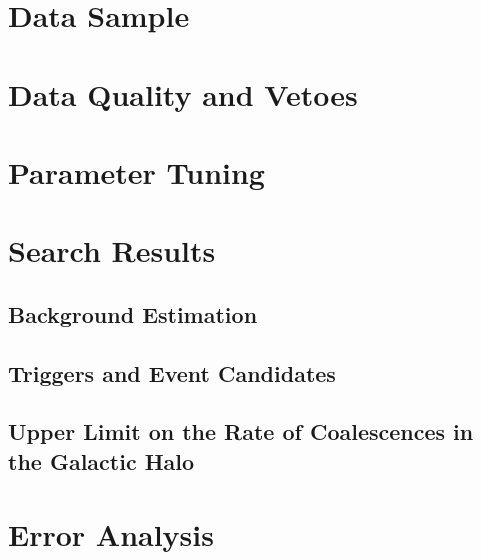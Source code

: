 \section{Data Sample}

\section{Data Quality and Vetoes}

\section{Parameter Tuning}

\section{Search Results}

\subsection{Background Estimation}

\subsection{Triggers and Event Candidates}

\subsection{Upper Limit on the Rate of Coalescences in the Galactic Halo}

\section{Error Analysis}

